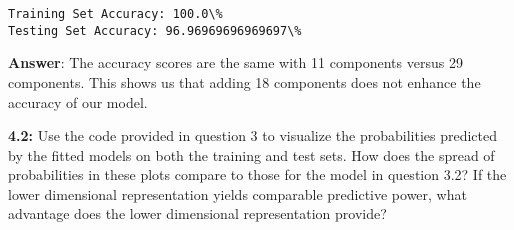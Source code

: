 \documentclass[11pt]{article}
\begin{document}
    \begin{Verbatim}[commandchars=\\\{\}]
Training Set Accuracy: 100.0\%
Testing Set Accuracy: 96.96969696969697\%

    \end{Verbatim}

    \textbf{Answer}: The accuracy scores are the same with 11 components
versus 29 components. This shows us that adding 18 components does not
enhance the accuracy of our model.

    \textbf{4.2:} Use the code provided in question 3 to visualize the
probabilities predicted by the fitted models on both the training and
test sets. How does the spread of probabilities in these plots compare
to those for the model in question 3.2? If the lower dimensional
representation yields comparable predictive power, what advantage does
the lower dimensional representation provide?
\end{document}
